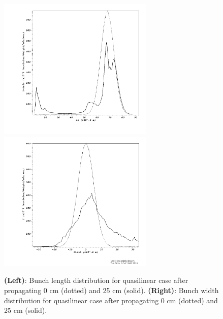 \documentclass[%
onecolumn, notitlepage,
 amsmath,amssymb,
 aps,
]{article}
\begin{document}
\begin{figure}[!ht]
\centering
\includegraphics[width=0.66\textwidth]{25cm_lengthdist_start_end.png}\vspace{-20pt}\\
\includegraphics[width=0.66\textwidth]{25cm_widthdist_start_end.png}
\caption{{\textbf{(Left)}}{: Bunch length distribution for quasilinear case after propagating 0 cm (dotted) and 25 cm (solid)}. {\textbf{(Right)}}{: Bunch width distribution for quasilinear case after propagating 0 cm (dotted) and 25 cm (solid)}.}
\end{figure}

\clearpage
\end{document}
